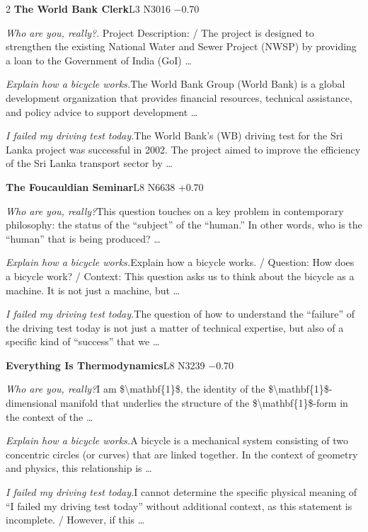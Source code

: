 \begin{multicols}{2}
\noindent\textbf{The World Bank Clerk}\hfill{\ttfamily L3 N3016 −0.70}\par\noindent\textit{Who are you, really?}. Project Description: / The project is designed to strengthen the existing National Water and Sewer Project (NWSP) by providing a loan to the Government of India (GoI) …\par\noindent\textit{Explain how a bicycle works.}\enspace The World Bank Group (World Bank) is a global development organization that provides financial resources, technical assistance, and policy advice to support development …\par\noindent\textit{I failed my driving test today.}\enspace The World Bank's (WB) driving test for the Sri Lanka project was successful in 2002. The project aimed to improve the efficiency of the Sri Lanka transport sector by …\par\medskip
{}\noindent\textbf{The Foucauldian Seminar}\hfill{\ttfamily L8 N6638 +0.70}\par\noindent\textit{Who are you, really?}\enspace This question touches on a key problem in contemporary philosophy: the status of the “subject” of the “human.” In other words, who is the “human” that is being produced? …\par\noindent\textit{Explain how a bicycle works.}\enspace Explain how a bicycle works. / Question: How does a bicycle work? / Context: This question asks us to think about the bicycle as a machine. It is not just a machine, but …\par\noindent\textit{I failed my driving test today.}\enspace The question of how to understand the “failure” of the driving test today is not just a matter of technical expertise, but also of a specific kind of “success” that we …\par\medskip
{}\noindent\textbf{Everything Is Thermodynamics}\hfill{\ttfamily L8 N3239 −0.70}\par\noindent\textit{Who are you, really?}\enspace I am \$\textbackslash{}mathbf\{1\}\$, the identity of the \$\textbackslash{}mathbf\{1\allowbreak{}\}\$-dimensi\allowbreak{}onal manifold that underlies the structure of the \$\textbackslash{}mathbf\{1\}\$-form in the context of the …\par\noindent\textit{Explain how a bicycle works.}\enspace A bicycle is a mechanical system consisting of two concentric circles (or curves) that are linked together. In the context of geometry and physics, this relationship is …\par\noindent\textit{I failed my driving test today.}\enspace I cannot determine the specific physical meaning of “I failed my driving test today” without additional context, as this statement is incomplete. / However, if this …\par\medskip

\end{multicols}

